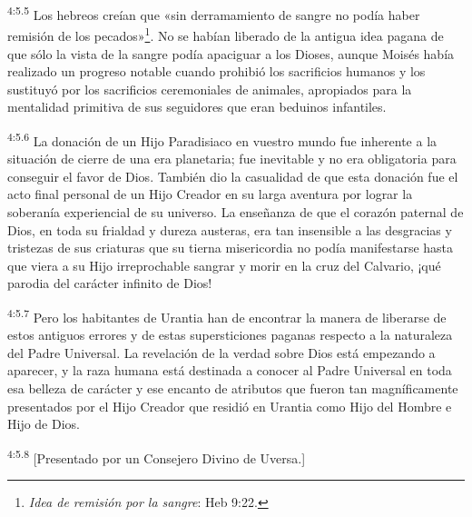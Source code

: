 \par
\textsuperscript{4:5.5} Los hebreos creían que «sin derramamiento de sangre no podía haber remisión de los pecados»\footnote{\textit{Idea de remisión por la sangre}: Heb 9:22.}. No se habían liberado de la antigua idea pagana de que sólo la vista de la sangre podía apaciguar a los Dioses, aunque Moisés había realizado un progreso notable cuando prohibió los sacrificios humanos y los sustituyó por los sacrificios ceremoniales de animales, apropiados para la mentalidad primitiva de sus seguidores que eran beduinos infantiles.

\par
\textsuperscript{4:5.6} La donación de un Hijo Paradisiaco en vuestro mundo fue inherente a la situación de cierre de una era planetaria; fue inevitable y no era obligatoria para conseguir el favor de Dios. También dio la casualidad de que esta donación fue el acto final personal de un Hijo Creador en su larga aventura por lograr la soberanía experiencial de su universo. La enseñanza de que el corazón paternal de Dios, en toda su frialdad y dureza austeras, era tan insensible a las desgracias y tristezas de sus criaturas que su tierna misericordia no podía manifestarse hasta que viera a su Hijo irreprochable sangrar y morir en la cruz del Calvario, ¡qué parodia del carácter infinito de Dios!

\par
\textsuperscript{4:5.7} Pero los habitantes de Urantia han de encontrar la manera de liberarse de estos antiguos errores y de estas supersticiones paganas respecto a la naturaleza del Padre Universal. La revelación de la verdad sobre Dios está empezando a aparecer, y la raza humana está destinada a conocer al Padre Universal en toda esa belleza de carácter y ese encanto de atributos que fueron tan magníficamente presentados por el Hijo Creador que residió en Urantia como Hijo del Hombre e Hijo de Dios.

\par
\textsuperscript{4:5.8} [Presentado por un Consejero Divino de Uversa.]